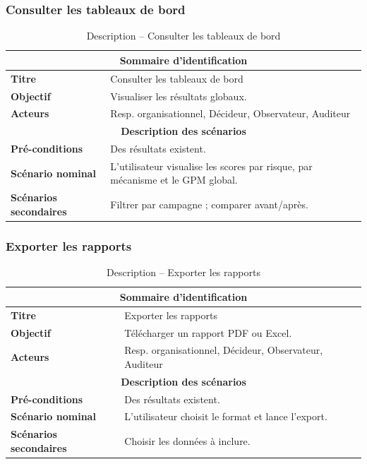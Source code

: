 \subsubsection{Consulter les tableaux de bord}
\begin{table}[H]
\centering
\renewcommand{\arraystretch}{1.3}
\begin{tabular}{@{}p{}p{}@{}}
\hline
\multicolumn{2}{c}{\textbf{Sommaire d'identification}} \\
\hline
\textbf{Titre} & Consulter les tableaux de bord \\
\textbf{Objectif} & Visualiser les résultats globaux. \\
\textbf{Acteurs} & Resp. organisationnel, Décideur, Observateur, Auditeur \\
\hline
\multicolumn{2}{c}{\textbf{Description des scénarios}} \\
\hline
\textbf{Pré-conditions} & Des résultats existent. \\
\textbf{Scénario nominal} & L'utilisateur visualise les scores par risque, par mécanisme et le GPM global. \\
\textbf{Scénarios secondaires} & Filtrer par campagne ; comparer avant/après. \\
\hline
\end{tabular}
\caption{Description -- Consulter les tableaux de bord}
\end{table}

\subsubsection{Exporter les rapports}
\begin{table}[H]
\centering
\renewcommand{\arraystretch}{1.3}
\begin{tabular}{@{}p{}p{}@{}}
\hline
\multicolumn{2}{c}{\textbf{Sommaire d'identification}} \\
\hline
\textbf{Titre} & Exporter les rapports \\
\textbf{Objectif} & Télécharger un rapport PDF ou Excel. \\
\textbf{Acteurs} & Resp. organisationnel, Décideur, Observateur, Auditeur \\
\hline
\multicolumn{2}{c}{\textbf{Description des scénarios}} \\
\hline
\textbf{Pré-conditions} & Des résultats existent. \\
\textbf{Scénario nominal} & L'utilisateur choisit le format et lance l'export. \\
\textbf{Scénarios secondaires} & Choisir les données à inclure. \\
\hline
\end{tabular}
\caption{Description -- Exporter les rapports}
\end{table}

